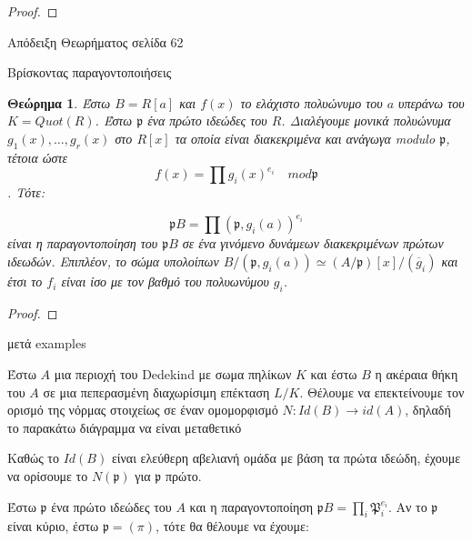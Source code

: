 \documentclass[oneside,a4paper]{article}
\newtheorem{theorem}{Θεώρημα}
\newcommand {\tl}{\textlatin}
\begin{document}
\begin{proof}
\end{proof}

Απόδειξη Θεωρήματος σελίδα 62


\pagebreak


Βρίσκοντας παραγοντοποιήσεις


\begin{theorem} Έστω $B=R[a]$ και $f(x)$ το ελάχιστο πολυώνυμο του $a$ υπεράνω του $K = Quot(R)$. Έστω $\mathfrak{p}$ ένα πρώτο ιδεώδες του $R$. Διαλέγουμε μονικά πολυώνυμα $g_1(x),\ldots,g_r(x)$ στο $R[x]$ τα οποία είναι διακεκριμένα και ανάγωγα \tl{modulo} $\mathfrak{p}$, τέτοια ώστε 
	$$f(x) = \prod g_i(x)^{e_i} \quad mod\mathfrak{p}$$. Τότε:
	
	$$\mathfrak{p}B = \prod (\mathfrak{p},g_i(a))^{e_i}$$ είναι η παραγοντοποίηση του $\mathfrak{p}B$ σε ένα γινόμενο δυνάμεων διακεκριμένων πρώτων ιδεωδών. Επιπλέον, το σώμα υπολοίπων $B/(\mathfrak{p},g_i(a)) \simeq (A/\mathfrak{p})[x]/(\overline{g}_i)$ και έτσι το $f_i$ είναι ίσο με τον βαθμό του πολυωνύμου $g_i$.
\end{theorem}

\begin{proof}
\end{proof}



μετά \tl{examples}




\pagebreak

Έστω $A$ μια περιοχή του \tl{Dedekind} με σωμα πηλίκων $K$ και έστω $B$ η ακέραια θήκη του $A$ σε μια πεπερασμένη διαχωρίσιμη επέκταση $L/K$. Θέλουμε να επεκτείνουμε τον ορισμό της νόρμας στοιχείως σε έναν ομομορφισμό $N: Id(B) \rightarrow id(A)$, δηλαδή το παρακάτω διάγραμμα να είναι μεταθετικό


\begin{figure}[ht]
	\centering
\end{figure}


Καθώς το $Id(B)$ είναι ελεύθερη αβελιανή ομάδα με βάση τα πρώτα ιδεώδη, έχουμε να ορίσουμε το $N(\mathfrak{p})$ για $\mathfrak{p}$ πρώτο.


Έστω $\mathfrak{p}$ ένα πρώτο ιδεώδες του $A$ και η παραγοντοποίηση $\mathfrak{p} B = \prod_i \mathfrak{P}^{e_i}_i$. Αν το $\mathfrak{p}$ είναι κύριο, έστω $\mathfrak{p} = (\pi)$, τότε θα θέλουμε να έχουμε:
\end{document}
